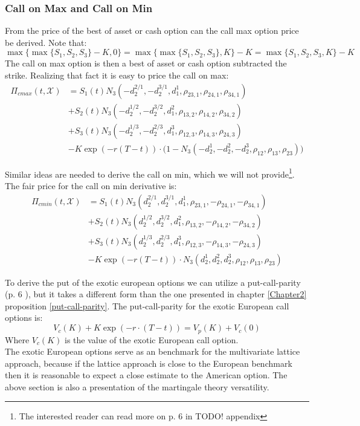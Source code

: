 \subsubsection{Call on Max and Call on Min}
From the price of the best of asset or cash option can the call max option price be derived. Note that:
$$\max\{\max\{ S_1,S_2,S_3 \} - K, 0\}=\max\{\max\{ S_1,S_2,S_3 \}, K\} - K = \max\{ S_1,S_2,S_3,K \} - K$$
The call on max option is then a best of asset or cash option subtracted the strike. Realizing that fact it is easy to price the call on max:
\begin{equation}\label{callMax}
\begin{split}
\Pi_{cmax}(t,\mathcal{X})&=S_1(t) N_3(-d_2^{2/1},-d_2^{3/1},d_1^{1}, \rho_{23,1}, \rho_{24,1}, \rho_{34,1}) \\
&+S_2(t) N_3(-d_2^{1/2},-d_2^{3/2},d_1^{2}, \rho_{13,2}, \rho_{14,2}, \rho_{34,2})\\
&+S_3(t) N_3(-d_2^{1/3},-d_2^{2/3},d_1^{3}, \rho_{12,3}, \rho_{14,3}, \rho_{24,3}) \\
&-K \exp(-r(T-t)) \cdot\bigg(1 - N_3(-d_2^1,-d_2^2,-d_2^3, \rho_{12}, \rho_{13}, \rho_{23})\bigg)
\end{split}
\end{equation}

Similar ideas are needed to derive the call on min, which we will not provide\footnote{The interested reader can read more on p. 6 in \parencite{Ouwehand2006} TODO! appendix}. The fair price for the call on min derivative is:
\begin{equation*}\label{callMin}
\begin{split}
\Pi_{cmin}(t,\mathcal{X})&=S_1(t) N_3(d_2^{2/1},d_2^{3/1},d_1^{1}, \rho_{23,1}, -\rho_{24,1}, -\rho_{34,1}) \\
&+S_2(t) N_3(d_2^{1/2},d_2^{3/2},d_1^{2}, \rho_{13,2}, -\rho_{14,2}, -\rho_{34,2})\\
&+S_3(t) N_3(d_2^{1/3},d_2^{2/3},d_1^{3}, \rho_{12,3}, -\rho_{14,3}, -\rho_{24,3}) \\
&-K \exp(-r(T-t)) \cdot N_3(d_2^1,d_2^2,d_2^3, \rho_{12}, \rho_{13}, \rho_{23})
\end{split}
\end{equation*}

To derive the put of the exotic european options we can utilize a put-call-parity (p. 6 \parencite{Ouwehand2006}), but it takes a different form than the one presented in chapter \ref{Chapter2} proposition \ref{put-call-parity}. The put-call-parity for the exotic European call options is:
\begin{equation*}\label{putMin}
V_c(K)+K\exp(-r\cdot (T-t)) = V_p(K)+V_c(0)
\end{equation*}
Where $V_c(K)$ is the value of the exotic European call option.\\

The exotic European options serve as an benchmark for the multivariate lattice approach, because if the lattice approach is close to the European benchmark then it is reasonable to expect a close estimate to the American option. The above section is also a presentation of the martingale theory versatility. 



